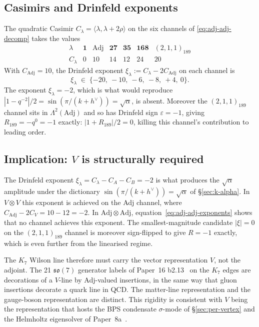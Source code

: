 \documentclass[11pt]{article}
\newcommand{\so}{\mathfrak{so}}
\newcommand{\Adj}{\mathrm{Adj}}
\newcommand{\hv}{h^{\vee}}
\begin{document}
\subsection{Casimirs and Drinfeld exponents}

The quadratic Casimir
$C_\lambda = \langle \lambda, \lambda + 2\rho \rangle$ on the six
channels of \eqref{eq:adj-adj-decomp} takes the values
\begin{equation}
  \begin{array}{c|cccccc}
    \lambda & \mathbf{1} & \Adj & \mathbf{27} & \mathbf{35}
            & \mathbf{168} & (2,1,1)_{189} \\
    \hline
    C_\lambda & 0 & 10 & 14 & 12 & 24 & 20
  \end{array}
  \label{eq:adj-adj-casimirs}
\end{equation}
With $C_\Adj = 10$, the Drinfeld exponent
$\xi_\lambda := C_\lambda - 2 C_\Adj$ on each channel is
\begin{equation}
  \xi_\lambda \;\in\; \{-20,\ -10,\ -6,\ -8,\ +4,\ 0\}.
  \label{eq:adj-adj-exponents}
\end{equation}
The exponent $\xi_\lambda = -2$, which is what would reproduce
$|1 - q^{-2}|/2 = \sin(\pi/(k+\hv)) = \sqrt{\alpha}$, is absent.
Moreover the $(2,1,1)_{189}$ channel sits in $\Lambda^2(\Adj)$
and so has Drinfeld sign $\varepsilon = -1$, giving
$R_{189} = -q^0 = -1$ exactly: $|1 + R_{189}|/2 = 0$, killing this
channel's contribution to leading order.

\subsection{Implication: $V$ is structurally required}

The Drinfeld exponent $\xi_\lambda = C_\lambda - C_A - C_B = -2$
is what produces the $\sqrt{\alpha}$ amplitude under the
dictionary $\sin(\pi/(k+\hv)) = \sqrt{\alpha}$ of
\S\ref{sec:k-alpha}.  In $V \otimes V$ this exponent is achieved
on the Adj channel, where $C_\Adj - 2 C_V = 10 - 12 = -2$.  In
$\Adj \otimes \Adj$, equation~\eqref{eq:adj-adj-exponents} shows
that no channel achieves this exponent.  The smallest-magnitude
candidate $|\xi| = 0$ on the $(2,1,1)_{189}$ channel is moreover
sign-flipped to give $R = -1$ exactly, which is even further
from the linearised regime.

The $K_7$ Wilson line therefore must carry the vector
representation $V$, not the adjoint.  The 21 $\so(7)$ generator
labels of Paper~16 b2.13~\cite{paper16} on the $K_7$ edges are
decorations of a $V$-line by Adj-valued insertions, in the same
way that gluon insertions decorate a quark line in QCD.  The
matter-line representation and the gauge-boson representation
are distinct.  This rigidity is consistent with $V$ being the
representation that hosts the BPS condensate $\sigma$-mode of
\S\ref{sec:per-vertex} and the Helmholtz eigensolver of
Paper~8a~\cite{paper8a}.
\end{document}
